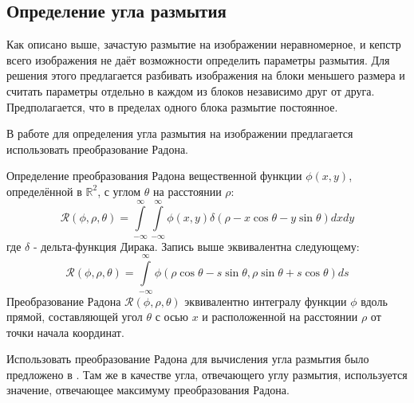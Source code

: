 \subsection{Определение угла размытия}

Как описано выше, зачастую размытие на изображении неравномерное, и кепстр всего изображения не даёт возможности определить параметры размытия. Для решения этого предлагается разбивать изображения на блоки меньшего размера и считать параметры отдельно в каждом из блоков независимо друг от друга.
Предполагается, что в пределах одного блока размытие постоянное.

В работе для определения угла размытия на изображении предлагается использовать преобразование Радона.

Определение преобразования Радона вещественной функции $\phi(x, y)$,
определённой в $\mathbb{R}^{2}$, с углом $\theta$ на расстоянии $\rho$:
$$
\mathcal{R}(\phi, \rho, \theta)=\int\limits_{-\infty}^{\infty} \int\limits_{-\infty}^{\infty} \phi(x, y) 
\delta(\rho-x \cos \theta-y \sin \theta) d x d y
$$
где $\delta$ - дельта-функция Дирака. Запись выше эквивалентна следующему:
$$
\mathcal{R}(\phi, \rho, \theta)=\int\limits_{-\infty}^{\infty} 
\phi(\rho \cos \theta-s \sin \theta, \rho \sin \theta+s \cos \theta) d s
$$
Преобразование Радона $\mathcal{R}(\phi, \rho, \theta)$ 
эквивалентно интегралу функции $\phi$ вдоль прямой, составляющей угол $\theta$
с осью $x$ и расположенной на расстоянии $\rho$ от точки начала координат. 

\par

Использовать преобразование Радона для вычисления угла размытия было предложено в \cite{moghaddam}. 
Там же в качестве угла, отвечающего углу размытия, используется значение, отвечающее максимуму преобразования Радона. 

